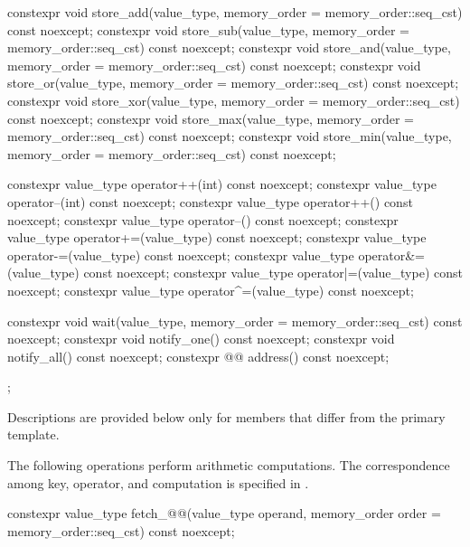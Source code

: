 \begin{codeblock}
{{    constexpr void store_add(value_type,
                             memory_order = memory_order::seq_cst) const noexcept;
    constexpr void store_sub(value_type,
                             memory_order = memory_order::seq_cst) const noexcept;
    constexpr void store_and(value_type,
                             memory_order = memory_order::seq_cst) const noexcept;
    constexpr void store_or(value_type,
                            memory_order = memory_order::seq_cst) const noexcept;
    constexpr void store_xor(value_type,
                             memory_order = memory_order::seq_cst) const noexcept;
    constexpr void store_max(value_type,
                             memory_order = memory_order::seq_cst) const noexcept;
    constexpr void store_min(value_type,
                             memory_order = memory_order::seq_cst) const noexcept;

    constexpr value_type operator++(int) const noexcept;
    constexpr value_type operator--(int) const noexcept;
    constexpr value_type operator++() const noexcept;
    constexpr value_type operator--() const noexcept;
    constexpr value_type operator+=(value_type) const noexcept;
    constexpr value_type operator-=(value_type) const noexcept;
    constexpr value_type operator&=(value_type) const noexcept;
    constexpr value_type operator|=(value_type) const noexcept;
    constexpr value_type operator^=(value_type) const noexcept;

    constexpr void wait(value_type, memory_order = memory_order::seq_cst) const noexcept;
    constexpr void notify_one() const noexcept;
    constexpr void notify_all() const noexcept;
    constexpr @@ address() const noexcept;
  };
}
\end{codeblock}

\pnum
Descriptions are provided below only for members
that differ from the primary template.

\pnum
The following operations perform arithmetic computations.
The correspondence among key, operator, and computation is specified
in .

%
%
%
%
%
%
%
\begin{itemdecl}
constexpr value_type fetch_@@(value_type operand,
  memory_order order = memory_order::seq_cst) const noexcept;
\end{itemdecl}

